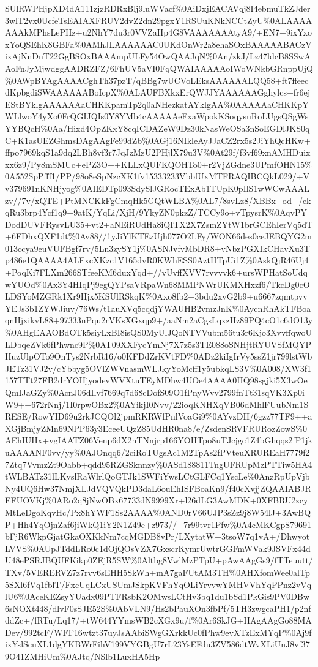 \documentclass[]{article}
\begin{document}
SUlRWPHjpXD4dA111zjzRDRxBlj9luWVacf\%0AiDxjEACAVqj8I4ebmuTkZJder3wlT2vx0UcfeTsEAIAXFRUV2dvZ2dn29pgxY1RSUuKNkNCCtZyU\%0ALAAAAAAAkMPhsLePHz+u2NhY7du3r0VVZaHp4G8VAAAAAAAtyA9/+EN7+9ixYxoxYoQSEhK8GBFa\%0AMhJLAAAAAAC0UKdOnWr2a8ehaSOxBAAAAABACzVixAjNnDnT22GgBSOxBAAAmpULFy54OwQAAJqN\%0An/zkJ/Lz47ldcB8SSwAAoFnJyMjwdggAADRZFZ/6FhUV5aVI0FqQWAIAAAAAoIWoWNkbGRnppUjQ\%0AWpBYAgAAAACghTh37pzT/qBBg7wUCVoLEksAAAAAALQQ58+ft7ffeecdKpbgdiSWAAAAAABoIcpX\%0ALAUFBXkxErQWJJYAAAAAAGghylcs+fr6ejEStBYklgAAAAAAaCHKKpamTp2q0aNHezkatAYklgAA\%0AAAAAaCHKKpYWLlwoY4yXo0FrQGIJQIs0Y8YMb4cAAAAAeFxaWpokKSoqysuRoLUgsQSgWsYYBQcH\%0Aa/Hixd4OpZKxY8cqICDAZeW9Dz30kNasWeOSa3nSoEGDlJKS0qC+K1asUEZGhmsDAgAAgFe99dZb\%0AGj16NIkleAyJJaCZ2rx5s2JiYhQcHKw+ffpo7969kqS1a9dq2LBh8vf3r7JqJzMzU2PHjlX79u3V\%0At29f/f3vf69xnAMHDuixxx6z9/Py8mSMUc+ePZ3O++KLLxQUFKQOHTo0+r2VjZGdne3UPmfOHN15\%0A552SpPfff1/PP/98o8eSpNzcXK1fv15333233VbbfUxMTFRAQIBCQkL029/+Vv379691nKNHjyog\%0AIEDTp093SdySlJGRocTExAb1TUpK0pIlS1wWCwAAALzv//7v/xQTE+PtMNCKkFgCmqHk5GQtWLBA\%0AL7/8svLz8/XBBx+od+/ekqRu3brp4Ycf1q9+9atK/YqLi/XjH/9YkyZN0pkzZ/TCCy9o+vTpysrK\%0AqvPYDodDUVFRysvLU35+vt2+aNEiRUdHa8iQITX2X7ZsmZYtW1brGCEhIerVq5dT+6FDhxQXF1dt\%0Av88//1yJiYlKTEzUjh077O2LFy/WON66des0ceJEBQYG2m013ccya9euVUFBgf7rv/5Ln3zySY1j\%0ASNJvfvMbDR8+vNbzPGXIkCHavXu3Tp486e1QAAAA4ALFxcXKzc1V165dvR0KWhESS0AztHTpUi1Z\%0AskQjR46Uj4+PoqKi7FLXm266STfeeKM6duxYqd+//vUvffXVV7rvvvvk6+ursWPHatSoUdqwYUOd\%0Ax3Y4HIqPj9egQYPsaVRpaWn68MMPNWrUKMXHxzf6/TkcDg0cOLDSYoMZGRk1Xr9Hjx5KSUlRSkqK\%0Axo8fb2+3bdu2xvG2b9+u6667zqmtpvvYEJs3b1ZYWJiuv/76Ws/t1auXVq5cqdjYWAUHB2vmzJnK\%0AycnRhAkTFBoaqnHjxikvL88+97333nPqu2rVKsXGxqp9+/aaNm2aCgsLqxzHz89PQ4cO1c6dO13y\%0AHgEAAOBdOTk5siyLxBI8isQS0MyUlJQoNTVVubm56tu3r6Kjo3XvvffqwoULDbqeZVk6fPhwnc9P\%0AT09XXFycYmNj7X7z5s3TE088oSNHjtRYUVSfMQYPHuzUlpOTo9OnTys2NrbR16/o0KFDdZrKVtFD\%0ADz2kiIgIrVy5ssZ1jr799lstWbJETz31VJ2v/cYbbyg5OVlZWVnasmWLJkyYoMcff1y5ubkqLS3V\%0A008/XW3f1157TTt27FB2drYOHjyodevWVXtuTEyMDhw4UOe4AAAA0HQ98sgjki5X3wOeQmIJaGZy\%0AcnJ06dIlvf7669q7d68cDofS09O1fPnyWvv2799fnTt31sqVK3Xp0iW9++672rNnj/1I0rpwOBx2\%0AYikjI0Nvv/22ioqKNHXqVB06dMhlFUubNm1SRESE/RowYID69u2rkJCQOl2jpmRKRWfPnlVoaGi9\%0AYvzDH/6gzz77TF9++aXGjBmjyZMn69NPP63y3EceeUQzZ85UdHR0na8/e/ZsdenSRVFRURozZowS\%0AEhIUHx+vgIAATZ06Venp6dX2nTNnjrp166YOHTpo8uTJcjgc1Z4bGhqqs2fP1jkuAAAANF0vv/yy\%0AJOnqq6/2ciRoTUgsAc1M2TpAs2fPVteuXRUREaH7779f27Ztq7VvmzZt9Oabb+qdd95RZGSknnzy\%0ASd188811TngUFRUpMzPTTiw5HA4tWLBATz31lLKyslRaWlrlQoGTJk1SWFiYwsLCtGLFCq1YscLe\%0AnzRpUpVjbNy4UQ6Hw37NmjXLJdVQVQkPD3daL6ouEhISFBoaKn9/f40cXvjjZQAAIABJREFUOVKj\%0ARo2q8jNwOBx67733dN9999Xr+l26dLG3AwMDK+0XFBRU2zcyMtLeDgoKqvHc/Px8hYWF1Ss2AAAA\%0AND0rV66UJP3sZz9j8W54lJ+3AwBQP+Hh4YqOjnZaf6jiWkQ1iY2N1Z49e+z973//+7r99tvr1Pfw\%0A4cMKCgpS79691bFjR6WkpGjatGkaOXKkNm7cqMGDB8vPr/LXytatW+3tsoW7q1vA+/DhwyotLVVS\%0AUpJTddLRo0c1dOjQOsVZX7GxscrKymrUwtrGGFmWVak9JSVFx44dU48ePSRJBQUFKikp0ZEjR5SW\%0Altbg8VwlMzPTpU+pAwAAgGs9/fTTeuutt/TXv/5VERERVZ7z7rvv6sEHH5SkWh+mA7gaFUtAM3TH\%0AHXfomWee0alTp5SXl6fVq1fblT/FxcUqLCxUSUmJSkpKVFhYqOLiYrvvwYMHVVhYqPPnz2vVqlU6\%0AceKEZsyYUadx09PTFRsbK2OMwsLCtHv3bq1du1bSd1PkGis9PV0DBw6sNOXt448/dlvF0sSJE52S\%0AbVLN9/Hs2bPauXOn3fbPf/5TH3zwgcaPH1/p2nfddZc+/fRTu/Lq17/+tW644YYmsWB2cXGx9u/f\%0Ar6SkJG+HAgAAgGo88MADev/992tcF/WFF16wtzt37uyJsAAbiSWgGXrkkUc0fPhw9evXTzExMYqP\%0Aj9fixYslScuXL1dgYKBWrFihV199VYGBgU7rL23YsEFdu3ZV586dtWvXLiUnJ8vf379O41ZMHiUm\%0AJtq/NSlb1LuxHA5Hp
\end{document}
